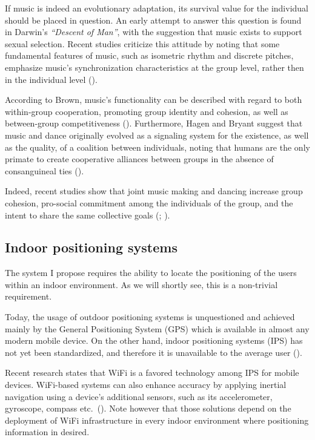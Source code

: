 \documentclass[a4paper,11pt]{article}
\begin{document}
If music is indeed an evolutionary adaptation, its survival value for the individual should be placed in question.
An early attempt to answer this question is found in Darwin's \textit{``Descent of Man''}, with the suggestion that music exists to support sexual selection.
Recent studies criticize this attitude by noting that some fundamental features of music, such as isometric rhythm and discrete pitches, emphasize music's synchronization characteristics at the group level, rather then in the individual level (\cite{Brown2000}).

According to Brown, music's functionality can be described with regard to both within-group cooperation, promoting group identity and cohesion, as well as between-group competitiveness (\cite*{Brown2000}).
Furthermore, Hagen and Bryant suggest that music and dance originally evolved as a signaling system for the existence, as well as the quality, of a coalition between individuals, noting that humans are the only primate to create cooperative alliances between groups in the absence of consanguineal ties (\cite*{Hagen2003}).

Indeed, recent studies show that joint music making and dancing increase group cohesion, pro-social commitment among the individuals of the group, and the intent to share the same collective goals (\cite{Kirschner2010}; \cite{Knoblich2011}).

\subsection{Indoor positioning systems}

The system I propose requires the ability to locate the positioning of the users within an indoor environment.
As we will shortly see, this is a non-trivial requirement.

Today, the usage of outdoor positioning systems is unquestioned and achieved mainly by the General Positioning System (GPS) which is available in almost any modern mobile device.
On the other hand, indoor positioning systems (IPS) has not yet been standardized, and therefore it is unavailable to the average user (\cite{web:turetsky}).

Recent research states that WiFi is a favored technology among IPS for mobile devices.
WiFi-based systems can also enhance accuracy by applying inertial navigation using a device's additional sensors, such as its accelerometer, gyroscope, compass etc.\ (\cite{web:harrop}).
Note however that those solutions depend on the deployment of WiFi infrastructure in every indoor environment where positioning information in desired.
\end{document}
